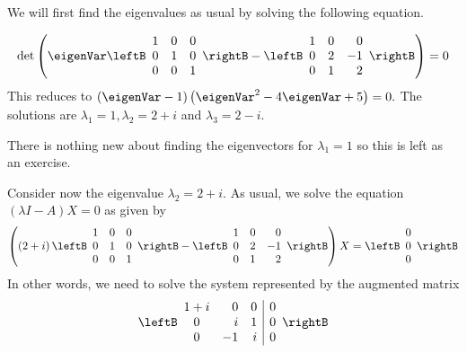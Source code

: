 \begin{solution}
We will first find the eigenvalues as usual by solving the following equation. 

\begin{equation*}
\det \left( 
\eigenVar \leftB
\begin{array}{rrr}
1 & 0 & 0 \\
0 & 1 & 0 \\
0 & 0 & 1
\end{array}
\rightB 
- \leftB
\begin{array}{rrr}
1 & 0 &  0 \\
0 & 2 & -1 \\
0 & 1 &  2
\end{array}
\rightB  \right) =0
\end{equation*}
This reduces to $ \left( \eigenVar -1\right) \left(
\eigenVar^{2}-4 \eigenVar +5\right) =0.$ The solutions are $\lambda_1
=1,\lambda_2 = 2+i$ and $\lambda_3 =2-i.$

There is nothing new about finding the eigenvectors for $\lambda_1 =1$ so 
this is left as an exercise. 

Consider now the eigenvalue $\lambda_2 =2+i.$ As usual, we solve the equation $\left(\lambda I -A \right) X = 0$ as given by 
\begin{equation*}
\left(
\left( 2+i\right) \leftB
\begin{array}{rrr}
1 & 0 & 0 \\
0 & 1 & 0 \\
0 & 0 & 1
\end{array}
\rightB - 
\leftB
\begin{array}{rrr}
1 & 0 & 0 \\
0 & 2 & -1 \\
0 & 1 & 2
\end{array}
\rightB
 \right)
X
 =\leftB
\begin{array}{r}
0 \\
0 \\
0
\end{array}
\rightB
\end{equation*}
In other words, we need to solve the system represented by the augmented matrix
\begin{equation*}
\leftB
\begin{array}{crr|r}
1+i &  0 & 0 & 0 \\
0   &  i & 1 & 0 \\
0   & -1 & i & 0
\end{array}
\rightB
\end{equation*}


\end{solution}
